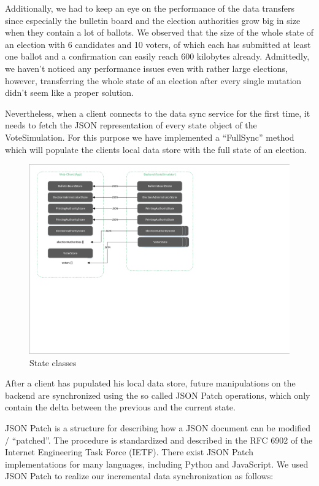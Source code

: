 Additionally, we had to keep an eye on the performance of the data transfers since especially the bulletin board and the election authorities grow big in size when they contain a lot of ballots. We observed that the size of the whole state of an election with 6 candidates and 10 voters, of which each has submitted at least one ballot and a confirmation can easily reach 600 kilobytes already. Admittedly, we haven't noticed any performance issues even with rather large elections, however, transferring the whole state of an election after every single mutation didn't seem like a proper solution.

Nevertheless, when a client connects to the data sync service for the first time, it needs to fetch the JSON representation of every state object of the VoteSimulation. For this purpose we have implemented a "`FullSync"' method which will populate the clients local data store with the full state of an election.

\begin{figure}[h!]
\begin{center}
\includegraphics[scale=0.60]{assets/datastores.pdf}
\caption{State classes}
\end{center}
\end{figure}

After a client has pupulated his local data store, future manipulations on the backend are synchronized using the so called JSON Patch operations, which only contain the delta between the previous and the current state.

JSON Patch is a structure for describing how a JSON document can be modified / "`patched"'. The procedure is standardized and described in the RFC 6902 of the Internet Engineering Task Force (IETF). There exist JSON Patch implementations for many languages, including Python and JavaScript. We used JSON Patch to realize our incremental data synchronization as follows:

